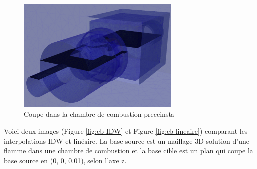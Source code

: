 \begin{figure}[H]
    \centering
    \includegraphics[width=0.70\textwidth]{images/coupe_preccinsta.png}
    \caption{Coupe dans la chambre de combustion preccinsta}
    \label{fig:coupe_preccinsta}
\end{figure}

Voici deux images (Figure \ref{fig:cb-IDW} et Figure \ref{fig:cb-lineaire}) comparant les interpolations IDW et linéaire. La base source est un maillage 3D solution d'une flamme dans une chambre de combustion et la base cible est un plan qui coupe la base source en (0, 0, 0.01), selon l'axe z.

